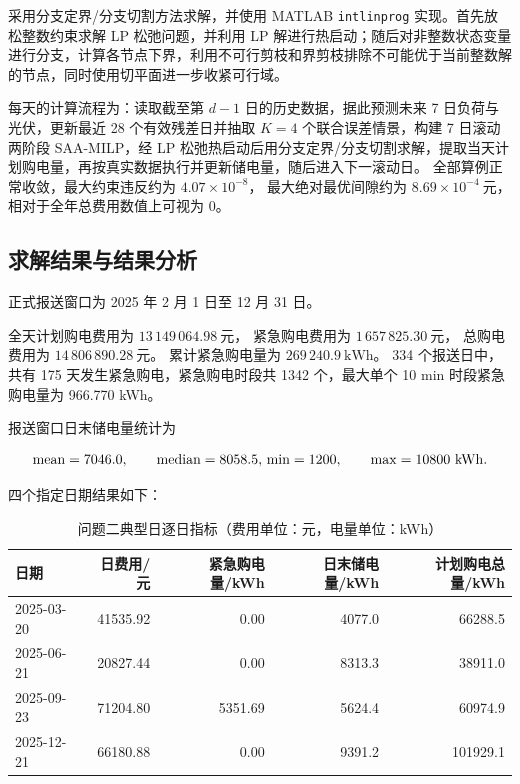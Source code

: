采用分支定界/分支切割方法求解，并使用 MATLAB \texttt{intlinprog} 实现。首先放松整数约束求解 LP 松弛问题，并利用 LP 解进行热启动；随后对非整数状态变量进行分支，计算各节点下界，利用不可行剪枝和界剪枝排除不可能优于当前整数解的节点，同时使用切平面进一步收紧可行域。

每天的计算流程为：读取截至第 $d-1$ 日的历史数据，据此预测未来 7 日负荷与光伏，更新最近 28 个有效残差日并抽取 $K=4$ 个联合误差情景，构建 7 日滚动两阶段 SAA-MILP，经 LP 松弛热启动后用分支定界/分支切割求解，提取当天计划购电量，再按真实数据执行并更新储电量，随后进入下一滚动日。
全部算例正常收敛，最大约束违反约为 \(4.07\times10^{-8}\)， 最大绝对最优间隙约为 \(8.69\times10^{-4}\ \mathrm{元}\)， 相对于全年总费用数值上可视为 0。

\subsection{求解结果与结果分析}

正式报送窗口为 2025 年 2 月 1 日至 12 月 31 日。

全天计划购电费用为 \(13\,149\,064.98\ \mathrm{元}\)， 紧急购电费用为 \(1\,657\,825.30\ \mathrm{元}\)， 总购电费用为 \(\boxed{
14\,806\,890.28\ \mathrm{元}
}\)。 累计紧急购电量为 \(269\,240.9\ \mathrm{kWh}\)。 334 个报送日中，共有 175 天发生紧急购电，紧急购电时段共 1342 个，最大单个 10 min 时段紧急购电量为 966.770 kWh。

报送窗口日末储电量统计为

\[
\text{mean}=7046.0,
\qquad
\text{median}=8058.5,\\
\min=1200,
\qquad
\max=10800\ {\rm kWh}.
\]

四个指定日期结果如下：

\begin{table}[H]
\centering
{}
\begin{tabular}{lrrrr}
\toprule
日期 & 日费用/元 & 紧急购电量/kWh & 日末储电量/kWh & 计划购电总量/kWh \\
\midrule
2025-03-20 & 41535.92 & 0.00 & 4077.0 & 66288.5 \\
2025-06-21 & 20827.44 & 0.00 & 8313.3 & 38911.0 \\
2025-09-23 & 71204.80 & 5351.69 & 5624.4 & 60974.9 \\
2025-12-21 & 66180.88 & 0.00 & 9391.2 & 101929.1 \\
\bottomrule
\end{tabular}
\caption{问题二典型日逐日指标（费用单位：元，电量单位：kWh）}
\label{tab:7}
\end{table}

